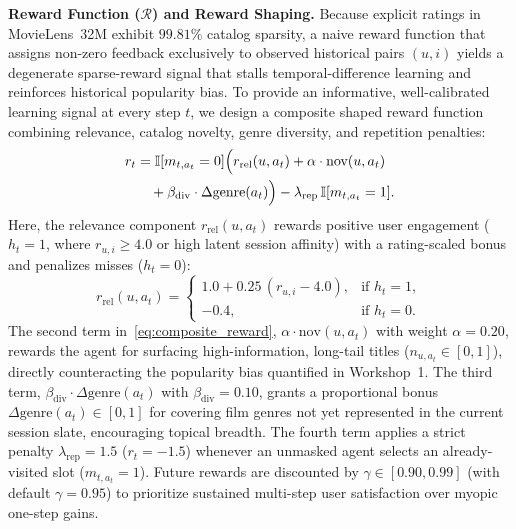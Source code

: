 \textbf{Reward Function ($\mathcal{R}$) and Reward Shaping.} Because explicit ratings in MovieLens~32M exhibit $99.81\%$ catalog sparsity, a naive reward function that assigns non-zero feedback exclusively to observed historical pairs $(u, i)$ yields a degenerate sparse-reward signal that stalls temporal-difference learning and reinforces historical popularity bias. To provide an informative, well-calibrated learning signal at every step $t$, we design a composite shaped reward function combining relevance, catalog novelty, genre diversity, and repetition penalties:
\begin{equation}
\label{eq:composite_reward}
\begin{aligned}
r_t &= \mathbb{I}[m_{t,a_t} = 0] \Bigl( r_{\text{rel}}(u, a_t) + \alpha \cdot \text{nov}(u, a_t) \\
    &\quad + \beta_{\text{div}} \cdot \Delta\text{genre}(a_t) \Bigr) - \lambda_{\text{rep}}\,\mathbb{I}[m_{t,a_t} = 1].
\end{aligned}
\end{equation}
Here, the relevance component $r_{\text{rel}}(u, a_t)$ rewards positive user engagement ($h_t = 1$, where $r_{u,i} \ge 4.0$ or high latent session affinity) with a rating-scaled bonus and penalizes misses ($h_t = 0$):
\begin{equation}
\label{eq:relevance_reward}
r_{\text{rel}}(u, a_t) = 
\begin{cases}
1.0 + 0.25\,(r_{u,i} - 4.0), & \text{if } h_t = 1, \\[4pt]
-0.4, & \text{if } h_t = 0.
\end{cases}
\end{equation}
The second term in~\eqref{eq:composite_reward}, $\alpha \cdot \text{nov}(u, a_t)$ with weight $\alpha = 0.20$, rewards the agent for surfacing high-information, long-tail titles ($n_{u,a_t} \in [0, 1]$), directly counteracting the popularity bias quantified in Workshop~1. The third term, $\beta_{\text{div}} \cdot \Delta\text{genre}(a_t)$ with $\beta_{\text{div}} = 0.10$, grants a proportional bonus $\Delta\text{genre}(a_t) \in [0, 1]$ for covering film genres not yet represented in the current session slate, encouraging topical breadth. The fourth term applies a strict penalty $\lambda_{\text{rep}} = 1.5$ ($r_t = -1.5$) whenever an unmasked agent selects an already-visited slot ($m_{t,a_t} = 1$). Future rewards are discounted by $\gamma \in [0.90, 0.99]$ (with default $\gamma = 0.95$) to prioritize sustained multi-step user satisfaction over myopic one-step gains.

